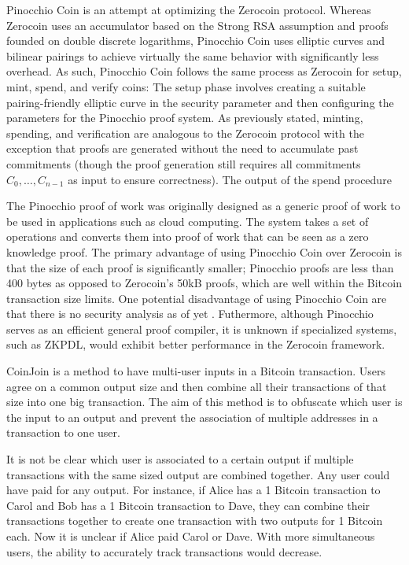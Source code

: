 Pinocchio Coin \cite{pinocchio} is an attempt at optimizing the Zerocoin protocol. Whereas Zerocoin uses an accumulator based on the Strong RSA assumption and proofs founded on double discrete logarithms, Pinocchio Coin uses elliptic curves and bilinear pairings to achieve virtually the same behavior with significantly less overhead. As such, Pinocchio Coin follows the same process as Zerocoin for {\sf setup}, {\sf mint}, {\sf spend}, and {\sf verify} coins: The setup phase involves creating a suitable pairing-friendly elliptic curve in the security parameter and then configuring the parameters for the Pinocchio proof system. As previously stated, minting, spending, and verification are analogous to the Zerocoin protocol with the exception that proofs are generated without the need to accumulate past commitments (though the proof generation still requires all commitments $C_0,\dots,C_{n-1}$ as input to ensure correctness). The output of the spend procedure 

The Pinocchio proof of work was originally designed as a generic proof of work to be used in applications such as cloud computing. The system takes a set of operations and converts them into proof of work that can be seen as a zero knowledge proof. The primary advantage of using Pinocchio Coin over Zerocoin is that the size of each proof is significantly smaller; Pinocchio proofs are less than 400 bytes as opposed to Zerocoin's 50kB proofs, which are well within the Bitcoin transaction size limits. One potential disadvantage of using Pinocchio Coin are that there is no security analysis as of yet \cite{pinocchio}. Futhermore, although Pinocchio serves as an efficient general proof compiler, it is unknown if specialized systems, such as ZKPDL, would exhibit better performance in the Zerocoin framework.

CoinJoin \cite{coinjoin} is a method to have multi-user inputs in a Bitcoin transaction. Users agree on a common output size and then combine all their transactions of that size into one big transaction. The aim of this method is to obfuscate which user is the input to an output and prevent the association of multiple addresses in a transaction to one user.

It is not be clear which user is associated to a certain output if multiple transactions with the same sized output are combined together. Any user could have paid for any output. For instance, if Alice has a 1 Bitcoin transaction to Carol and Bob has a 1 Bitcoin transaction to Dave, they can combine their transactions together to create one transaction with two outputs for 1 Bitcoin each. Now it is unclear if Alice paid Carol or Dave. With more simultaneous users, the ability to accurately track transactions would decrease.

